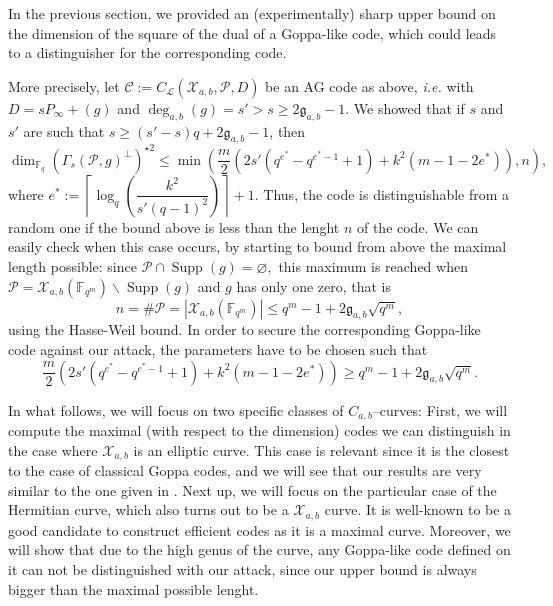 \documentclass[a4paper]{article}
\theoremstyle{definition}
\theoremstyle{remark}
\newcommand{\calP}{\mathcal{P}}
\newcommand{\calL}{\mathcal{L}}
\newcommand{\calC}{\mathcal{C}}
\newcommand{\calX}{\mathcal{X}}
\newcommand{\fqm}{\mathbb{F}_{q^m}}
\newcommand{\fq}{\mathbb{F}_{q}}
\newcommand{\Supp}{\operatorname{Supp}}
\newcommand{\degab}[1]{\deg_{a,b}\left(#1\right)}
\begin{document}
\noindent In the previous section, we provided an (experimentally) sharp upper bound on the dimension of the square of the dual of a Goppa-like code, which could leads to a distinguisher for the corresponding code. 

More precisely, let $\calC := C_\calL(\calX_{a,b},\calP,D)$ be an AG code as above, \emph{i.e.} with $D = sP_\infty +(g)$ and $\degab{g} = s'>s\geq 2\mathfrak{g}_{a,b}-1$. We showed that if $s$ and $s'$ are such that $s \geq (s'-s)q+2\mathfrak{g}_{a,b}-1$, then
\begin{equation} \label{eq:best_upper_bound}
\dim_{\fq} (\Gamma_s(\calP,g)^{\perp})^{\star 2} \leq \min \left(\frac{m}{2}\left(2s'(q^{e^*}-q^{e^*-1}+1)+k^2(m-1-2e^*)  \right),n\right),
\end{equation}
where $e^* := \left\lceil \log_q\left(\dfrac{k^2}{s'(q-1)^2}\right)\right\rceil+1$. Thus, the code is distinguishable from a random one if the bound above is less than the lenght $n$ of the code. We can easily check when this case occurs, by starting to bound from above the maximal length possible: since $\calP \cap \Supp(g) = \varnothing,$ this maximum is reached when $\calP = \calX_{a,b}(\fqm) \backslash \Supp(g)$ and $g$ has only one zero, that is
$$n = \# \calP = |\calX_{a,b}(\fqm)| \leq q^m-1+2\mathfrak{g}_{a,b}\sqrt{q^m},$$
using the Hasse-Weil bound. In order to secure the corresponding Goppa-like code against our attack, the parameters have to be chosen such that 
\begin{equation} \label{eq:cond_not_to_distinguish}
\frac{m}{2}\left(2s'(q^{e^*}-q^{e^*-1}+1)+k^2(m-1-2e^*)  \right)\geq q^m-1+2\mathfrak{g}_{a,b}\sqrt{q^m}.
\end{equation}

\noindent In what follows, we will focus on two specific classes of $C_{a,b}$--curves: First, we will compute the maximal (with respect to the dimension) codes we can distinguish in the case where $\calX_{a,b}$ is an elliptic curve. This case is relevant since it is the closest to the case of classical Goppa codes, and we will see that our results are very similar to the one given in \cite{MT21}. Next up, we will focus on the particular case of the Hermitian curve, which also turns out to be a $\calX_{a,b}$ curve. It is well-known to be a good candidate to construct efficient codes as it is a maximal curve. Moreover, we will show that due to the high genus of the curve, any Goppa-like code defined on it can not be distinguished with our attack, since our upper bound is always bigger than the maximal possible lenght.
\end{document}
